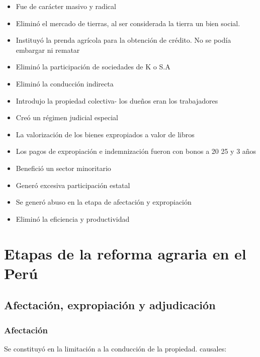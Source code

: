 \documentclass[
  letterpaper,
  DIV=11,
  numbers=noendperiod]{scrartcl}
\providecommand{\tightlist}{%
  \setlength{\itemsep}{0pt}\setlength{\parskip}{0pt}}\usepackage{longtable,booktabs,array}
\begin{document}
\begin{itemize}
\tightlist
\item
  Fue de carácter masivo y radical
\item
  Eliminó el mercado de tierras, al ser considerada la tierra un bien
  social.
\item
  Instituyó la prenda agrícola para la obtención de crédito. No se podía
  embargar ni rematar
\item
  Eliminó la participación de sociedades de K o S.A
\item
  Eliminó la conducción indirecta
\item
  Introdujo la propiedad colectiva- los dueños eran los trabajadores
\item
  Creó un régimen judicial especial
\item
  La valorización de los bienes expropiados a valor de libros
\item
  Los pagos de expropiación e indemnización fueron con bonos a 20 25 y 3
  años
\item
  Benefició un sector minoritario
\item
  Generó excesiva participación estatal
\item
  Se generó abuso en la etapa de afectación y expropiación
\item
  Eliminó la eficiencia y productividad
\end{itemize}

\hypertarget{etapas-de-la-reforma-agraria-en-el-peruxfa}{%
\section{Etapas de la reforma agraria en el
Perú}\label{etapas-de-la-reforma-agraria-en-el-peruxfa}}

\hypertarget{afectaciuxf3n-expropiaciuxf3n-y-adjudicaciuxf3n}{%
\subsection{Afectación, expropiación y
adjudicación}\label{afectaciuxf3n-expropiaciuxf3n-y-adjudicaciuxf3n}}

\hypertarget{afectaciuxf3n}{%
\subsubsection{Afectación}\label{afectaciuxf3n}}

Se constituyó en la limitación a la conducción de la propiedad.
causales:
\end{document}
